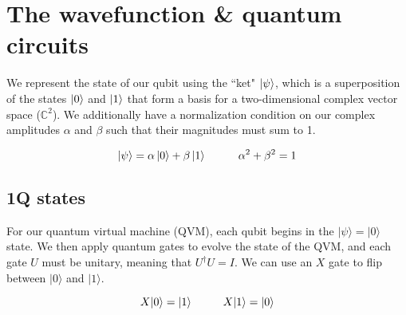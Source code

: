 \documentclass[12pt, letterpaper]{article}
\begin{document}
\def\q#1{*+{\rule[-0.2ex]{0ex}{2.1ex}|#1\>}}
\def\qv#1#2{*+{\rule[-0.2ex]{0ex}{2.1ex}|#1\>=|#2\>}}


\newbox{\sbox}

\def\gspace#1{*+{\rule[-0.2ex]{0ex}{2.1ex}%
	\setbox\sbox=\hbox{$#1$}%
	\hspace*{\wd\sbox}}}

\def\gnqubit#1#2{\gspace{#1}
		 \save [].[#2]!C="qq"*[F]\frm{}\restore
		 \save "qq"*[]{#1} \restore}

\def\gtwo#1{\gnqubit{#1}{d}}

\def\gthree#1{\gnqubit{#1}{dd}}


\section{The wavefunction \& quantum circuits}

We represent the state of our qubit using the ``ket" $\ket{\psi}$, which is a superposition of the states $\ket{0}$ and $\ket{1}$ that form a
basis for a two-dimensional complex vector space ($\mathbb{C}^2$). We additionally have a normalization condition on our complex amplitudes $\alpha$ and $\beta$ such that their magnitudes must sum to 1.

$$\ket{\psi} = \alpha \ket{0} + \beta \ket{1} \hspace{1 cm} \alpha^2 + \beta^2 = 1$$

\subsection{1Q states}

For our quantum virtual machine (QVM), each qubit begins in the $|\psi\rangle = |0\rangle$ state. We then apply quantum gates to evolve the state of the QVM, and each gate $U$ must be unitary, meaning that $U^{\dag}U = I$. We can use an $X$ gate to flip between $|0\rangle$ and $|1\rangle$.

$$X|0\rangle = |1\rangle \hspace{1 cm} X|1\rangle = |0\rangle \vspace{3 mm}$$
\end{document}
